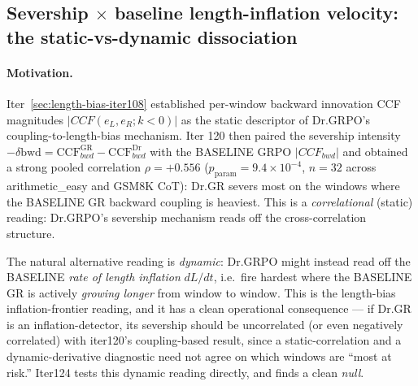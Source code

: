 
\subsection{Severship $\times$ baseline length-inflation velocity: the static-vs-dynamic dissociation}
\label{sec:length-bias-iter124}

\paragraph{Motivation.}
Iter~\ref{sec:length-bias-iter108} established per-window backward
innovation CCF magnitudes $|CCF(e_L,e_R;k<0)|$ as the static
descriptor of Dr.GRPO's coupling-to-length-bias mechanism.  Iter
120 then paired the severship intensity
$-\delta\mathrm{bwd}=\mathrm{CCF}^{\mathrm{GR}}_{bwd}-\mathrm{CCF}^{\mathrm{Dr}}_{bwd}$
with the BASELINE GRPO $|CCF_{bwd}|$ and obtained a strong pooled
correlation $\rho=+0.556$ ($p_{\mathrm{param}}{=}9.4{\times}10^{-4}$,
$n{=}32$ across arithmetic\_easy and GSM8K CoT): Dr.GR severs most
on the windows where the BASELINE GR backward coupling is heaviest.
This is a \emph{correlational} (static) reading: Dr.GRPO's
severship mechanism reads off the cross-correlation structure.

The natural alternative reading is \emph{dynamic}: Dr.GRPO might
instead read off the BASELINE \emph{rate of length inflation}
$dL/dt$, i.e.\ fire hardest where the BASELINE GR is actively
\textit{growing longer} from window to window.  This is the
length-bias inflation-frontier reading, and it has a clean
operational consequence --- if Dr.GR is an inflation-detector,
its severship should be uncorrelated (or even negatively correlated)
with iter120's coupling-based result, since a static-correlation
and a dynamic-derivative diagnostic need not agree on which windows
are ``most at risk.''  Iter124 tests this dynamic reading directly,
and finds a clean \emph{null}.

